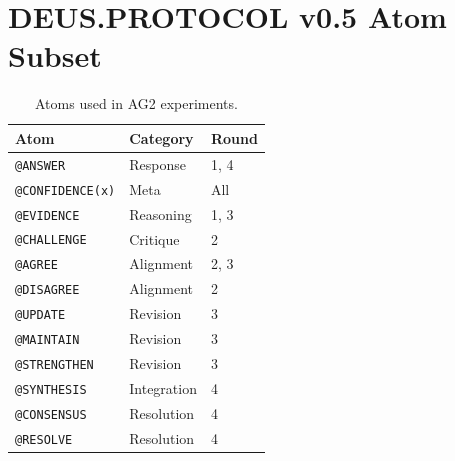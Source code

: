 \documentclass[11pt,a4paper]{article}
\begin{document}
\section{DEUS.PROTOCOL v0.5 Atom Subset}

\begin{table}[H]
\centering\small
\caption{Atoms used in AG2 experiments.}\label{tab:atoms}
\begin{tabular}{@{}lll@{}}
\toprule
\textbf{Atom} & \textbf{Category} & \textbf{Round} \\
\midrule
\texttt{@ANSWER}        & Response   & 1, 4 \\
\texttt{@CONFIDENCE(x)} & Meta       & All \\
\texttt{@EVIDENCE}       & Reasoning  & 1, 3 \\
\texttt{@CHALLENGE}      & Critique   & 2 \\
\texttt{@AGREE}          & Alignment  & 2, 3 \\
\texttt{@DISAGREE}       & Alignment  & 2 \\
\texttt{@UPDATE}         & Revision   & 3 \\
\texttt{@MAINTAIN}       & Revision   & 3 \\
\texttt{@STRENGTHEN}     & Revision   & 3 \\
\texttt{@SYNTHESIS}      & Integration & 4 \\
\texttt{@CONSENSUS}      & Resolution & 4 \\
\texttt{@RESOLVE}        & Resolution & 4 \\
\bottomrule
\end{tabular}
\end{table}
\end{document}
